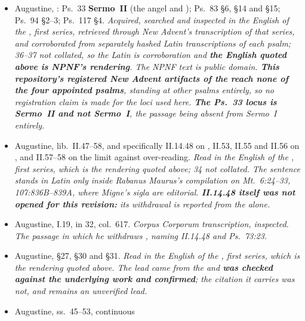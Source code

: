 \begin{itemize}[leftmargin=1.2em, itemsep=0.15em]
\item Augustine, : Ps.~33 \textbf{Sermo~II} (the
angel and ); Ps.~83 §6, §14 and §15; Ps.~94 §2--3;
Ps.~117 §4. \textit{Acquired, searched and inspected in the English of the
, first series, retrieved through New
Advent's transcription of that series, and corroborated from separately hashed
Latin transcriptions of each psalm;  36--37 not
collated, so the Latin is corroboration and \textbf{the English quoted above is
NPNF's rendering}. The NPNF text is public domain. \textbf{This repository's
registered New Advent artifacts of the  reach none of the
four appointed psalms}, standing at other psalms entirely, so no registration
claim is made for the loci used here. \textbf{The Ps.~33 locus is Sermo~II and
not Sermo~I}, the passage being absent from Sermo~I entirely.}
\item Augustine,  lib.~II.47--58, and
specifically II.14.48 on , II.53, II.55 and II.56 on
, and II.57--58 on the limit against over-reading. \textit{Read
in the English of the , first series,
which is the rendering quoted above;  34 not collated.
The  sentence stands in Latin only inside
Rabanus Maurus's compilation on Mt.\ 6:24--33, 
107:836B--839A, where Migne's sigla are editorial. \textbf{II.14.48 itself
was not opened for this revision:} its withdrawal is reported from the
 alone.}
\item Augustine,  I.19, in  32,
col.~617. \textit{Corpus Corporum transcription, inspected. The passage in
which he withdraws ,
naming  II.14.48 and Ps.\ 73:23.}
\item Augustine,  §27, §30 and §31. \textit{Read in
the English of the , first series, which
is the rendering quoted above. The lead came from the  and
\textbf{was checked against the underlying work and confirmed}; the
 citation it carries was not, and remains an unverified
lead.}
\item Augustine,  ss.~45--53, continuous

\end{itemize}
